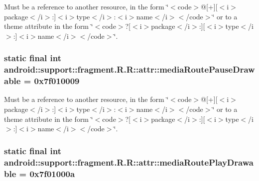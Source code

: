 Must be a reference to another resource, in the form \char`\"{}$<$code$>$@\mbox{[}+\mbox{]}\mbox{[}$<$i$>$package$<$/i$>$:\mbox{]}$<$i$>$type$<$/i$>$:$<$i$>$name$<$/i$>$$<$/code$>$\char`\"{} or to a theme attribute in the form \char`\"{}$<$code$>$?\mbox{[}$<$i$>$package$<$/i$>$:\mbox{]}\mbox{[}$<$i$>$type$<$/i$>$:\mbox{]}$<$i$>$name$<$/i$>$$<$/code$>$\char`\"{}. \hypertarget{classandroid_1_1support_1_1fragment_1_1_r_1_1attr_f168c11703b36b9b38d257b47ca81362}{
\subsubsection[{mediaRoutePauseDrawable}]{\setlength{\rightskip}{0pt plus 5cm}static final int android::support::fragment.R.R::attr::mediaRoutePauseDrawable = 0x7f010009}}
\label{classandroid_1_1support_1_1fragment_1_1_r_1_1attr_f168c11703b36b9b38d257b47ca81362}


Must be a reference to another resource, in the form \char`\"{}$<$code$>$@\mbox{[}+\mbox{]}\mbox{[}$<$i$>$package$<$/i$>$:\mbox{]}$<$i$>$type$<$/i$>$:$<$i$>$name$<$/i$>$$<$/code$>$\char`\"{} or to a theme attribute in the form \char`\"{}$<$code$>$?\mbox{[}$<$i$>$package$<$/i$>$:\mbox{]}\mbox{[}$<$i$>$type$<$/i$>$:\mbox{]}$<$i$>$name$<$/i$>$$<$/code$>$\char`\"{}. \hypertarget{classandroid_1_1support_1_1fragment_1_1_r_1_1attr_289ad72cc2969d89d6c6ff7f17b87c6c}{
\subsubsection[{mediaRoutePlayDrawable}]{\setlength{\rightskip}{0pt plus 5cm}static final int android::support::fragment.R.R::attr::mediaRoutePlayDrawable = 0x7f01000a}}
\label{classandroid_1_1support_1_1fragment_1_1_r_1_1attr_289ad72cc2969d89d6c6ff7f17b87c6c}


